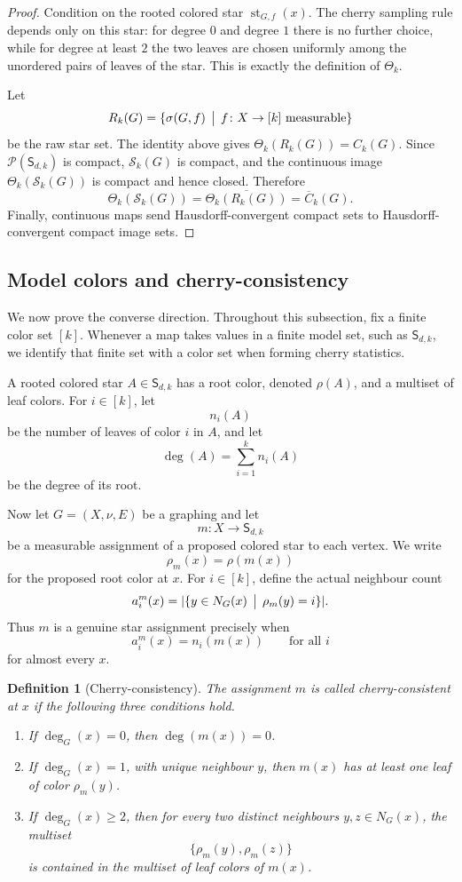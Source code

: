 \documentclass[11pt]{amsart}
\newcommand{\calP}{\mathcal P}
\newcommand{\calS}{\mathcal S}
\newtheorem{definition}[theorem]{Definition}
\theoremstyle{remark}
\begin{document}
\begin{proof}
Condition on the rooted colored star $\operatorname{st}_{G,f}(x)$. The cherry sampling rule depends only on this star: for degree $0$ and degree $1$ there is no further choice, while for degree at least $2$ the two leaves are chosen uniformly among the unordered pairs of leaves of the star. This is exactly the definition of $\Theta_k$.

Let
\[
 R_k(G)=\{\sigma(G,f)\,\bigm|\,f\colon X\to[k]\text{ measurable}\}
\]
be the raw star set.  The identity above gives $\Theta_k(R_k(G))=C_k(G)$.  Since $\calP(\mathsf S_{d,k})$ is compact, $\calS_k(G)$ is compact, and the continuous image $\Theta_k(\calS_k(G))$ is compact and hence closed.  Therefore
\[
 \Theta_k(\calS_k(G))=\overline{\Theta_k(R_k(G))}=\overline C_k(G).
\]
Finally, continuous maps send Hausdorff-convergent compact sets to Hausdorff-convergent compact image sets.
\end{proof}

\subsection{Model colors and cherry-consistency}

We now prove the converse direction. Throughout this subsection, fix a finite color set $[k]$.  Whenever a map takes values in a finite model set, such as $\mathsf S_{d,k}$, we identify that finite set with a color set when forming cherry statistics.

A rooted colored star $A\in\mathsf S_{d,k}$ has a root color, denoted $\rho(A)$, and a multiset of leaf colors. For $i\in[k]$, let
\[
 n_i(A)
\]
be the number of leaves of color $i$ in $A$, and let
\[
 \deg(A)=\sum_{i=1}^k n_i(A)
\]
be the degree of its root.

Now let $G=(X,\nu,E)$ be a graphing and let
\[
 m\colon X\to\mathsf S_{d,k}
\]
be a measurable assignment of a proposed colored star to each vertex. We write
\[
 \rho_m(x)=\rho(m(x))
\]
for the proposed root color at $x$. For $i\in[k]$, define the actual neighbour count
\[
 a_i^m(x)=|\{y\in N_G(x)\,\bigm|\,\rho_m(y)=i\}|.
\]
Thus $m$ is a genuine star assignment precisely when
\[
 a_i^m(x)=n_i(m(x))\qquad\text{for all }i
\]
for almost every $x$.

\begin{definition}[Cherry-consistency]\label{def:cherry-consistency}
The assignment $m$ is called \emph{cherry-consistent at $x$} if the following three conditions hold.
\begin{enumerate}[label=(\roman*)]
 \item If $\deg_G(x)=0$, then $\deg(m(x))=0$.
 \item If $\deg_G(x)=1$, with unique neighbour $y$, then $m(x)$ has at least one leaf of color $\rho_m(y)$.
 \item If $\deg_G(x)\geq 2$, then for every two distinct neighbours $y,z\in N_G(x)$, the multiset
 \[
  \{\rho_m(y),\rho_m(z)\}
 \]
 is contained in the multiset of leaf colors of $m(x)$.
\end{enumerate}
\end{definition}
\end{document}
